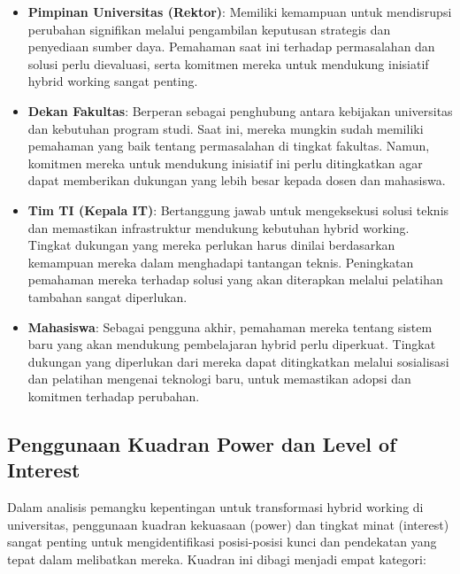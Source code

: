 \begin{itemize}
	\item \textbf{Pimpinan Universitas (Rektor)}: 
	Memiliki kemampuan untuk mendisrupsi perubahan signifikan melalui pengambilan keputusan strategis dan penyediaan sumber daya. Pemahaman saat ini terhadap permasalahan dan solusi perlu dievaluasi, serta komitmen mereka untuk mendukung inisiatif hybrid working sangat penting.
	
	\item \textbf{Dekan Fakultas}: 
	Berperan sebagai penghubung antara kebijakan universitas dan kebutuhan program studi. Saat ini, mereka mungkin sudah memiliki pemahaman yang baik tentang permasalahan di tingkat fakultas. Namun, komitmen mereka untuk mendukung inisiatif ini perlu ditingkatkan agar dapat memberikan dukungan yang lebih besar kepada dosen dan mahasiswa.
	
	\item \textbf{Tim TI (Kepala IT)}: 
	Bertanggung jawab untuk mengeksekusi solusi teknis dan memastikan infrastruktur mendukung kebutuhan hybrid working. Tingkat dukungan yang mereka perlukan harus dinilai berdasarkan kemampuan mereka dalam menghadapi tantangan teknis. Peningkatan pemahaman mereka terhadap solusi yang akan diterapkan melalui pelatihan tambahan sangat diperlukan.
	
	\item \textbf{Mahasiswa}: 
	Sebagai pengguna akhir, pemahaman mereka tentang sistem baru yang akan mendukung pembelajaran hybrid perlu diperkuat. Tingkat dukungan yang diperlukan dari mereka dapat ditingkatkan melalui sosialisasi dan pelatihan mengenai teknologi baru, untuk memastikan adopsi dan komitmen terhadap perubahan.
\end{itemize}


\subsection{Penggunaan Kuadran Power dan Level of Interest}

Dalam analisis pemangku kepentingan untuk transformasi hybrid working di universitas, penggunaan kuadran kekuasaan (power) dan tingkat minat (interest) sangat penting untuk mengidentifikasi posisi-posisi kunci dan pendekatan yang tepat dalam melibatkan mereka. Kuadran ini dibagi menjadi empat kategori:

